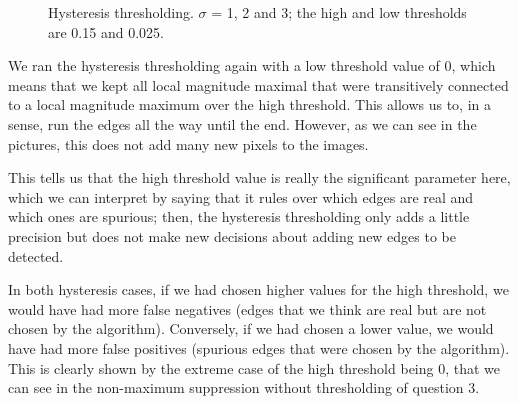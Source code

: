 \documentclass[a4paper]{article}
\begin{document}
\begin{figure}[h]
\begin{subfigure}{0.33\textwidth}
\end{subfigure}

\caption{Hysteresis thresholding. $\sigma$ = 1, 2 and 3; the high and low thresholds are 0.15 and 0.025.}

\end{figure}

\FloatBarrier

We ran the hysteresis thresholding again with a low threshold value of 0, which means that we kept all local magnitude maximal that were transitively connected to a local magnitude maximum over the high threshold.
This allows us to, in a sense, run the edges all the way until the end.
However, as we can see in the pictures, this does not add many new pixels to the images.

This tells us that the high threshold value is really the significant parameter here, which we can interpret by saying that it rules over which edges are real and which ones are spurious; then, the hysteresis thresholding only adds a little precision but does not make new decisions about adding new edges to be detected.

In both hysteresis cases, if we had chosen higher values for the high threshold, we would have had more false negatives (edges that we think are real but are not chosen by the algorithm).
Conversely, if we had chosen a lower value, we would have had more false positives (spurious edges that were chosen by the algorithm).
This is clearly shown by the extreme case of the high threshold being 0, that we can see in the non-maximum suppression without thresholding of question 3.
\end{document}
